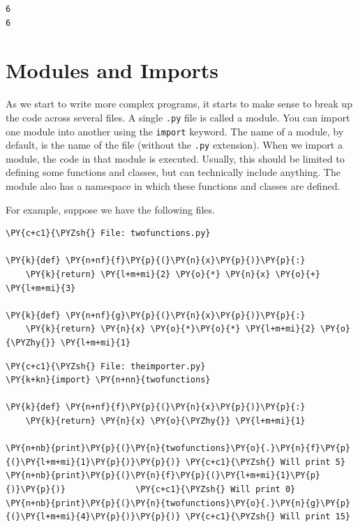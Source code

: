 \begin{Verbatim}
6
6

\end{Verbatim}

\section{Modules and Imports}


As we start to write more complex programs, it starts to make sense to break up the code across several files.  A single \texttt{.py} file is called a module.  You can import one module into another using the \texttt{import} keyword.  The name of a module, by default, is the name of the file (without the \texttt{.py} extension).  When we import a module, the code in that module is executed.  Usually, this should be limited to defining some functions and classes, but can technically include anything.  The module also has a namespace in which these functions and classes are defined.


For example, suppose we have the following files.

\begin{Verbatim}[commandchars=\\\{\}]
\PY{c+c1}{\PYZsh{} File: twofunctions.py}

\PY{k}{def} \PY{n+nf}{f}\PY{p}{(}\PY{n}{x}\PY{p}{)}\PY{p}{:}
    \PY{k}{return} \PY{l+m+mi}{2} \PY{o}{*} \PY{n}{x} \PY{o}{+} \PY{l+m+mi}{3}

\PY{k}{def} \PY{n+nf}{g}\PY{p}{(}\PY{n}{x}\PY{p}{)}\PY{p}{:}
    \PY{k}{return} \PY{n}{x} \PY{o}{*}\PY{o}{*} \PY{l+m+mi}{2} \PY{o}{\PYZhy{}} \PY{l+m+mi}{1}
\end{Verbatim}


\begin{Verbatim}[commandchars=\\\{\}]
\PY{c+c1}{\PYZsh{} File: theimporter.py}
\PY{k+kn}{import} \PY{n+nn}{twofunctions}

\PY{k}{def} \PY{n+nf}{f}\PY{p}{(}\PY{n}{x}\PY{p}{)}\PY{p}{:}
    \PY{k}{return} \PY{n}{x} \PY{o}{\PYZhy{}} \PY{l+m+mi}{1}

\PY{n+nb}{print}\PY{p}{(}\PY{n}{twofunctions}\PY{o}{.}\PY{n}{f}\PY{p}{(}\PY{l+m+mi}{1}\PY{p}{)}\PY{p}{)} \PY{c+c1}{\PYZsh{} Will print 5}
\PY{n+nb}{print}\PY{p}{(}\PY{n}{f}\PY{p}{(}\PY{l+m+mi}{1}\PY{p}{)}\PY{p}{)}              \PY{c+c1}{\PYZsh{} Will print 0}
\PY{n+nb}{print}\PY{p}{(}\PY{n}{twofunctions}\PY{o}{.}\PY{n}{g}\PY{p}{(}\PY{l+m+mi}{4}\PY{p}{)}\PY{p}{)} \PY{c+c1}{\PYZsh{} Will print 15}
\end{Verbatim}



